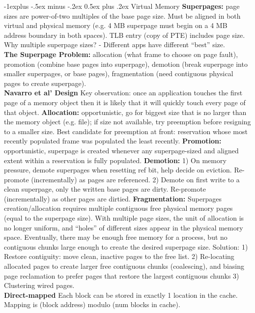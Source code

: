 \documentclass[9pt,landscape]{article}
\makeatletter
\renewcommand{\subsection}{\@startsection{subsection}{2}{0mm}%
                                {-1explus -.5ex minus -.2ex}%
                                {0.5ex plus .2ex}%
                                {\normalfont\normalsize\bfseries}}
\makeatother
\begin{document}
\begin{multicols}{3}
\subsection{Virtual Memory}
{\bf Superpages:} page sizes are power-of-two multiples of the base page size.
Must be aligned in both virtual and physical memory (e.g. 4 MB superpage must begin on a 4 MB address boundary in both spaces).
TLB entry (copy of PTE) includes page size.
Why multiple superpage sizes? - Different apps have different “best” size.\\
{\bf The Superpage Problem:} allocation (what frame to choose on page fault), promotion (combine base pages into superpage), demotion (break superpage into smaller superpages, or base pages), fragmentation (need contiguous physical pages to create superpage).\\
{\bf Navarro et al' Design}
Key observation: once an application touches the first page of a memory object then it is likely that it will quickly touch every page of that object.
{\bf Allocation:} opportunistic, go for biggest size that is no larger than the memory object (e.g. file); if size not available, try preemption before resigning to a smaller size. Best candidate for preemption at front: reservation whose most recently populated frame was populated the least recently.
{\bf Promotion:} opportunistic, superpage is created whenever any superpage-sized and aligned extent within a reservation is fully populated.
{\bf Demotion:} 1) On memory pressure, demote superpages when resetting ref bit, help decide on eviction. Re-promote (incrementally) as pages are referenced. 2) Demote on first write to a clean superpage, only the written base pages are dirty. Re-promote (incrementally) as other pages are dirtied.
{\bf Fragmentation:} Superpages creation/allocation requires multiple contiguous free physical memory pages (equal to the superpage size). With multiple page sizes, the unit of allocation is no longer uniform, and “holes” of different sizes appear in the physical memory space. Eventually, there may be enough free memory for a process, but no contiguous chunks large enough to create the desired superpage size. Solution: 1) Restore contiguity: move clean, inactive pages to the free list. 2) Re-locating allocated pages to create larger free contiguous chunks (coalescing), and biasing page reclamation to prefer pages that restore the largest contiguous chunks 3) Clustering wired pages.\\
{\bf Direct-mapped} Each block can be stored in exactly 1 location in the cache. Mapping is (block address) modulo (num blocks in cache).

\end{multicols}
\end{document}
